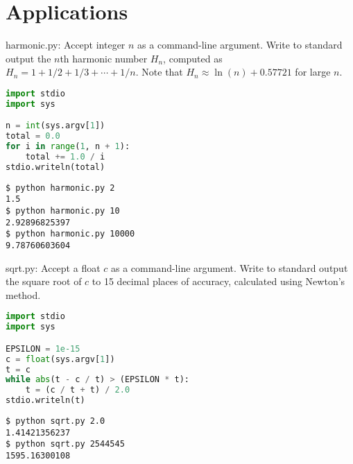 \documentclass[8pt,a4paper,compress]{beamer}
\begin{document}
\section{Applications}
\begin{frame}[fragile]
\begin{framed}
\tiny harmonic.py: Accept integer $n$ as a command-line argument. Write to standard output the $n$th harmonic number $H_n$, computed as $H_n=1+1/2+1/3+\cdots+1/n$. Note that $H_n \approx \ln(n) + 0.57721$ for large $n$.
\end{framed}

\begin{lstlisting}[language=Python]
import stdio
import sys

n = int(sys.argv[1])
total = 0.0
for i in range(1, n + 1):
    total += 1.0 / i
stdio.writeln(total)
\end{lstlisting}

\begin{lstlisting}[language={}]
$ python harmonic.py 2
1.5
$ python harmonic.py 10
2.92896825397
$ python harmonic.py 10000
9.78760603604
\end{lstlisting}
\end{frame}

\begin{frame}[fragile]
\begin{framed}
\tiny sqrt.py: Accept a float $c$ as a command-line argument. Write to standard output the square root of $c$ to 15 decimal places of accuracy, calculated using Newton's method.
\end{framed}

\begin{lstlisting}[language=Python]
import stdio
import sys

EPSILON = 1e-15
c = float(sys.argv[1])
t = c
while abs(t - c / t) > (EPSILON * t):
    t = (c / t + t) / 2.0
stdio.writeln(t)
\end{lstlisting}

\begin{lstlisting}[language={}]
$ python sqrt.py 2.0
1.41421356237
$ python sqrt.py 2544545
1595.16300108
\end{lstlisting}
\end{frame}
\end{document}
